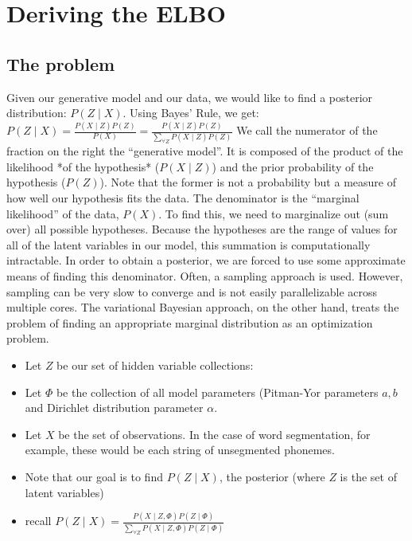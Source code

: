 
\section{Deriving the ELBO}
\label{append_a}
\subsection{The problem}

Given our generative model and our data, we would
like to find a posterior distribution: $P(Z \mid  X)$. Using
Bayes’ Rule, we get:
$P(Z\mid X) = \frac{P(X\mid Z)P(Z)}{P(X)} = \frac{P(X\mid Z)P(Z)}{\sum\limits_{\forall Z} P(X\mid Z) P(Z)}$
We call the numerator of the fraction on the right the “generative
model”. It is composed of the product of the likelihood *of the
hypothesis* ($P(X\mid Z)$) and the prior probability of the hypothesis
($P(Z)$). Note that the former is not a probability but a measure of how
well our hypothesis fits the data. The denominator is the ``marginal
likelihood'' of the data, $P(X)$. To find this, we need to marginalize
out (sum over) all possible hypotheses. Because the hypotheses are the
range of values for all of the latent variables in our model, this
summation is computationally intractable. In order to obtain a
posterior, we are forced to use some approximate means of finding this
denominator. Often, a sampling approach is used. However, sampling can
be very slow to converge and is not easily parallelizable across
multiple cores. The variational Bayesian approach, on the other hand,
treats the problem of finding an appropriate marginal distribution as an
optimization problem.

 \begin{itemize}
\item   Let $Z$ be our set of hidden variable collections: 
\item   Let $\Phi$ be the collection of all model parameters (Pitman-Yor
    parameters $a,b$ and Dirichlet distribution parameter $\alpha$.
\item   Let $X$ be the set of observations. In the case of word
    segmentation, for example, these would be each string of unsegmented
    phonemes.
\item   Note that our goal is to find $P(Z\mid X)$, the posterior (where $Z$ is
    the set of latent variables)
\item  recall $P(Z\mid X) = \frac{P(X\mid Z, \Phi)P(Z \mid  \Phi)}{\sum\limits_{\forall Z} P(X\mid Z, \Phi) P(Z\mid \Phi) } $ 
\end{itemize}


